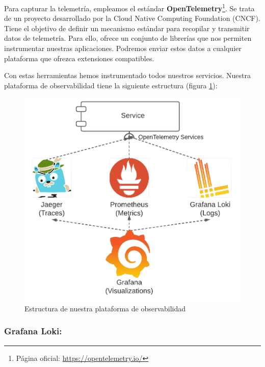 Para capturar la telemetría, empleamos el estándar \textbf{OpenTelemetry}\footnote{Página oficial: \url{https://opentelemetry.io/}}. Se trata de un proyecto desarrollado por la Cloud Native Computing Foundation (CNCF). Tiene el objetivo de definir un mecanismo estándar para recopilar y transmitir datos de telemetría. Para ello, ofrece un conjunto de librerías que nos permiten instrumentar nuestras aplicaciones. Podremos enviar estos datos a cualquier plataforma que ofrezca extensiones compatibles.

Con estas herramientas hemos instrumentado todos nuestros servicios. Nuestra plataforma de observabilidad tiene la siguiente estructura (figura \ref{fig:observability-telemetry-collection}):

\begin{figure}[h!]
  \centering
  \includegraphics[scale=0.25]{cap_despliegue/images/observability-telemetry-collection}
  \caption{Estructura de nuestra plataforma de observabilidad}
  \label{fig:observability-telemetry-collection}
\end{figure}

\pagebreak

\subsubsection{Grafana Loki: }

